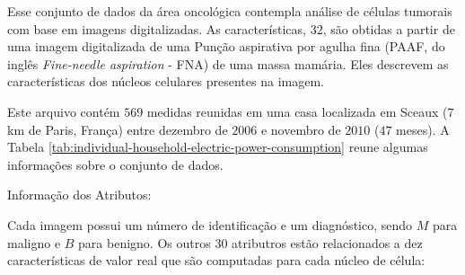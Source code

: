 Esse conjunto de dados da área oncológica contempla análise de células tumorais com base em imagens digitalizadas. As características, $32$, são obtidas a partir de uma imagem digitalizada de uma Punção aspirativa por agulha fina (PAAF, do inglês \textit{Fine-needle aspiration} - FNA) de uma massa mamária. Eles descrevem as características dos núcleos celulares presentes na imagem.


Este arquivo contém $569$ medidas reunidas em uma casa localizada em Sceaux ($7$ km de Paris, França) entre dezembro de $2006$ e novembro de $2010$ ($47$ meses). A Tabela \ref{tab:individual-household-electric-power-consumption} reune algumas informações sobre o conjunto de dados.



    

Informação dos Atributos:

Cada imagem possui um número de identificação e um diagnóstico, sendo $M$ para maligno e $B$ para benigno. Os outros $30$ atributros estão relacionados a dez características de valor real que são computadas para cada núcleo de célula:

